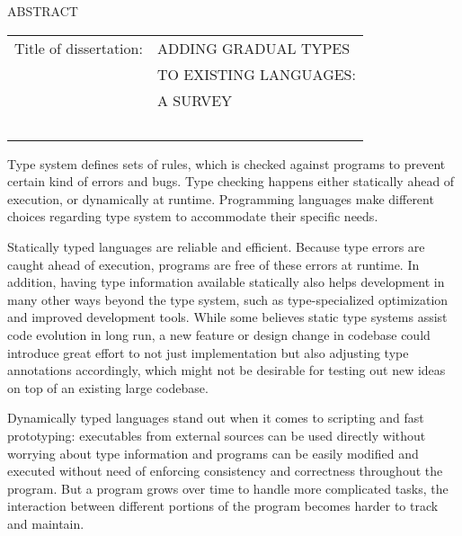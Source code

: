 \renewcommand{\baselinestretch}{1}
\small \normalsize

\begin{center}
\large{{ABSTRACT}}

\vspace{3em}

\end{center}
\hspace{-.15in}


\vspace{3em}
\begin{tabular}{ll}
	Title of dissertation:    & {\large  ADDING GRADUAL TYPES }\\
	&                     {\large  TO EXISTING LANGUAGES:} \\
	&                     {\large  A SURVEY} \\
	\ \\
\end{tabular}

\renewcommand{\baselinestretch}{2}
\large \normalsize



Type system defines sets of rules, which is checked against programs to
prevent certain kind of errors and bugs. Type checking happens either
statically ahead of execution, or dynamically at runtime.
Programming languages make different choices regarding type system to
accommodate their specific needs.

Statically typed languages are reliable and efficient.
Because type errors are caught ahead of execution,
programs are free of these errors at runtime.
In addition, having type information available statically also helps
development in many other ways beyond the type system, such as
type-specialized optimization and improved development tools.
While some believes static type systems assist code evolution in long run,
a new feature or design change in codebase could introduce
great effort to not just implementation
but also adjusting type annotations accordingly, which might not be desirable
for testing out new ideas on top of an existing large codebase.

Dynamically typed languages stand out when it comes to scripting and fast prototyping:
executables from external sources can be used directly without worrying about type information
and programs can be easily modified and executed
without need of enforcing consistency and correctness throughout the program.
But a program grows over time to handle more complicated tasks,
the interaction between different portions of the program becomes harder
to track and maintain.

